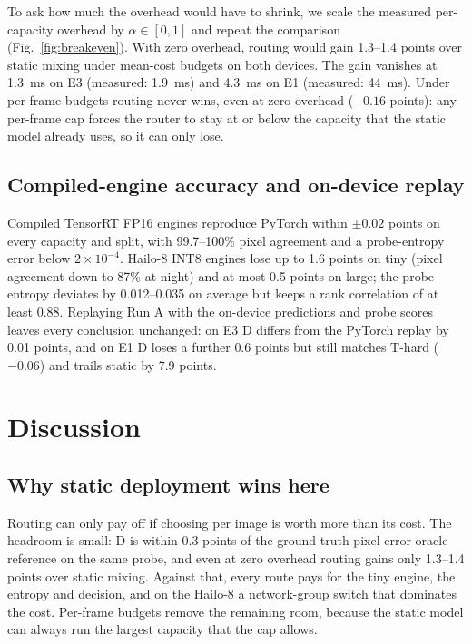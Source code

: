 \documentclass[a4paper,5p]{elsarticle}
\begin{document}
To ask how much the overhead would have to shrink, we scale the measured per-capacity overhead by $\alpha\in[0,1]$ and repeat the comparison (Fig.~\ref{fig:breakeven}). With zero overhead, routing would gain 1.3--1.4 points over static mixing under mean-cost budgets on both devices. The gain vanishes at 1.3~ms on E3 (measured: 1.9~ms) and 4.3~ms on E1 (measured: 44~ms). Under per-frame budgets routing never wins, even at zero overhead ($-0.16$ points): any per-frame cap forces the router to stay at or below the capacity that the static model already uses, so it can only lose.

\subsection{Compiled-engine accuracy and on-device replay}
\label{sec:compiled}

Compiled TensorRT FP16 engines reproduce PyTorch within $\pm0.02$ points on every capacity and split, with 99.7--100\% pixel agreement and a probe-entropy error below $2\times10^{-4}$. Hailo-8 INT8 engines lose up to 1.6 points on tiny (pixel agreement down to 87\% at night) and at most 0.5 points on large; the probe entropy deviates by 0.012--0.035 on average but keeps a rank correlation of at least 0.88. Replaying Run A with the on-device predictions and probe scores leaves every conclusion unchanged: on E3 D differs from the PyTorch replay by 0.01 points, and on E1 D loses a further 0.6 points but still matches T-hard ($-0.06$) and trails static by 7.9 points.

\section{Discussion}
\label{sec:discussion}

\subsection{Why static deployment wins here}

Routing can only pay off if choosing per image is worth more than its cost. The headroom is small: D is within 0.3 points of the ground-truth pixel-error oracle reference on the same probe, and even at zero overhead routing gains only 1.3--1.4 points over static mixing. Against that, every route pays for the tiny engine, the entropy and decision, and on the Hailo-8 a network-group switch that dominates the cost. Per-frame budgets remove the remaining room, because the static model can always run the largest capacity that the cap allows.
\end{document}
